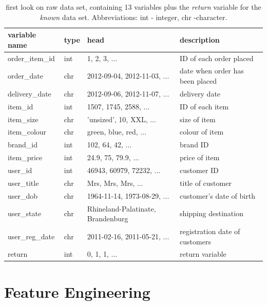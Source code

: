 \documentclass[a4paper,12pt]{article}
\begin{document}
\begin{table}[h]
\begin{center}
 \begin{tabular}{l | l  l | l}
 variable name & type & head & description\\
 \hline
 order\_item\_id & int & 1, 2, 3, ...               & ID of each order placed\\
 order\_date    & chr & 2012-09-04, 2012-11-03, ... & date when order has been placed \\
 delivery\_date & chr & 2012-09-06, 2012-11-07, ... & delivery date \\
 item\_id       & int & 1507, 1745, 2588, ...       & ID of each item \\
 item\_size     & chr & 'unsized', 10, XXL, ...     & size of item\\
 item\_colour   & chr & green, blue, red, ...       & colour of item\\
 brand\_id      & int & 102, 64, 42, ...            & brand ID\\
 item\_price    & int & 24.9, 75, 79.9, ...         & price of item\\
 user\_id       & int & 46943, 60979, 72232, ...    & customer ID\\
 user\_title    & chr & Mrs, Mrs, Mrs, ...          & title of customer \\
 user\_dob      & chr & 1964-11-14, 1973-08-29, ... & customer's date of birth\\
 user\_state    & chr & Rhineland-Palatinate, Brandenburg & shipping destination\\
 user\_reg\_date & chr & 2011-02-16, 2011-05-21, ...& registration date of customers \\
 \hline
 return        & int & 0, 1, 1, ...                 & return variable
 \end{tabular}
\end{center}
\caption{first look on raw data set, containing 13 variables plus the \textit{return} variable for the \textit{known} data set. Abbreviations: int - integer, chr -character.}
\label{raw data set}
\end{table}



\section{Feature Engineering} \label{Sec::Feature Eng}
\end{document}

